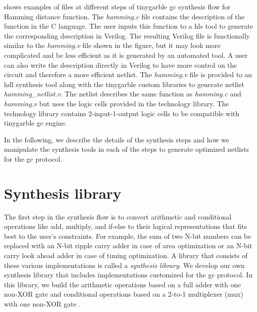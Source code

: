  shows examples of files at different steps of \gls{tinygarble} \acrshort{gc} synthesis flow for Hamming distance function.
The \textsl{hamming.c} file contains the description of the function in the C language.
The user inputs this function to a \acrshort{hls} tool to generate the corresponding description in Verilog.
The resulting Verilog file is functionally similar to the \textsl{hamming.v} file shown in the figure, but it may look more complicated and be less efficient as it is generated by an automated tool.
A user can also write the description directly in Verilog to have more control on the circuit and therefore a more efficient netlist.
The \textsl{hamming.v} file is provided to an \acrshort{hdl} synthesis tool along with the \gls{tinygarble} custom libraries to generate netlist \textsl{hamming\_netlist.v}.
The netlist describes the same function as \textsl{hamming.c} and \textsl{hamming.v} but uses the logic cells provided in the technology library.
The technology library contains 2-input-1-output logic cells to be compatible with \gls{tinygarble} \acrshort{gc} engine.

In the following, we describe the details of the synthesis steps and how we manipulate the synthesis tools in each of the steps to generate optimized netlists for the \acrshort{gc} protocol.

\section{Synthesis library}\label{sec:syn-synlib}
The first step in the synthesis flow is to convert arithmetic and conditional operations like add, multiply, and if-else to their logical representations that fits best to the user's constraints.
For example, the sum of two N-bit numbers can be replaced with an N-bit ripple carry adder in case of area optimization or an N-bit carry look ahead adder in case of timing optimization.
A library that consists of these various implementations is called a \emph{synthesis library}.
We develop our own synthesis library that includes implementations customized for the \acrshort{gc} protocol.
In this library, we build the arithmetic operations based on a full adder with one non-XOR gate \cite{boyar2006concrete} and conditional operations based on a 2-to-1 multiplexer (\acrshort{mux}) with one non-XOR gate \cite{kolesnikov2008improved}.

